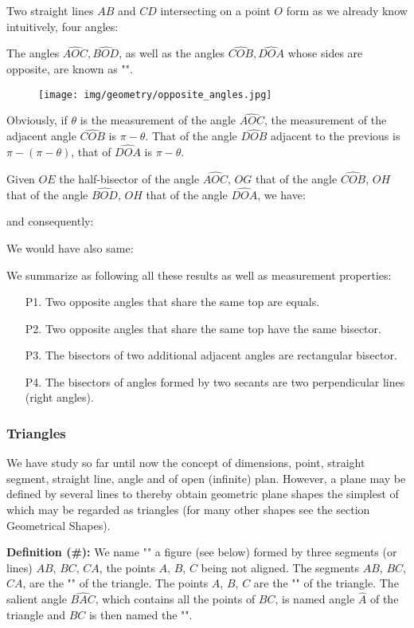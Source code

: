 	Two straight lines $AB$ and $CD$ intersecting on a point $O$ form as we already know intuitively, four angles:
	
	The angles $\widehat{AOC},\widehat{BOD}$, as well as the angles $\widehat{COB},\widehat{DOA}$ whose sides are opposite, are known as "".
	\begin{figure}[H]
		\centering
		\texttt{[image: img/geometry/opposite\_angles.jpg]}
	\end{figure}
	Obviously, if $\theta$ is the measurement of the angle $\widehat{AOC}$, the measurement of the adjacent angle $\widehat{COB}$ is $\pi-\theta$. That of the angle $\widehat{DOB}$ adjacent to the previous is $\pi-(\pi-\theta)$, that of $\widehat{DOA}$ is $\pi-\theta$.
	
	Given $OE$ the half-bisector of the angle $\widehat{AOC}$, $OG$ that of the angle $\widehat{COB}$, $OH$ that of the angle $\widehat{BOD}$, $OH$ that of the angle $\widehat{DOA}$, we have:
	
	and consequently:
	
	We would have also same:
	
	We summarize as following all these results as well as measurement properties:
	\begin{enumerate}
		\item[P1.] Two opposite angles that share the same top are equals.
		\item[P2.] Two opposite angles that share the same top have the same bisector.
		\item[P3.] The bisectors of two additional adjacent angles are rectangular bisector.
		\item[P4.] The bisectors of angles formed by two secants are two perpendicular lines (right angles).
	\end{enumerate}
	
	\pagebreak
	\subsubsection{Triangles}
	We have study so far until now the concept of dimensions, point, straight segment, straight line, angle and of open (infinite) plan. However, a plane may be defined by several lines to thereby obtain geometric plane shapes  the simplest of which may be regarded as triangles (for many other shapes see the section Geometrical Shapes).

	\textbf{Definition (\#\mydef):} We name "" a figure (see below) formed by three segments (or lines) $AB$, $BC$, $CA$, the points $A$, $B$, $C$ being not aligned. The segments $AB$, $BC$, $CA$, are the "" of the triangle. The points $A$, $B$, $C$ are the "" of the triangle. The salient angle $\widehat{BAC}$, which contains all the points of $BC$, is named angle $\hat{A}$ of the triangle and $BC$ is then named the "".
	

